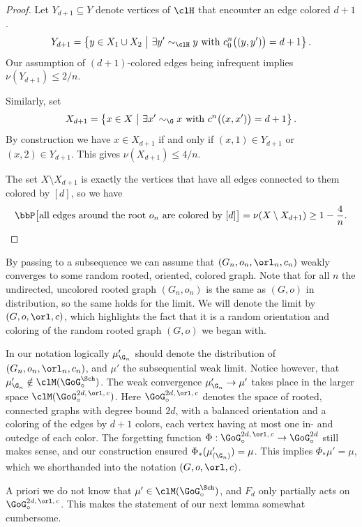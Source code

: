 \begin{proof}
Let $Y_{d+1}\subseteq Y$ denote vertices of $\clH$ that encounter an edge colored $d+1$.
\[
Y_{d+1}=\left\{y \in X_1 \cup X_2~\middle|~\exists y'\sim_{\clH} y \text{ with } c^n_0\big((y,y')\big)=d+1\right\}.
\]
Our assumption of $(d+1)$-colored edges being infrequent implies $\nu(Y_{d+1}) \leq 2/n$.

Similarly, set
\[
X_{d+1}=\left\{x \in X~\middle|~\exists x'\sim_{\G} x \text{ with } c^n\big((x,x')\big)=d+1\right\}.
\]
By construction we have $x \in X_{d+1}$ if and only if $(x,1) \in Y_{d+1}$ or $(x,2) \in Y_{d+1}$. This gives $\nu(X_{d+1}) \leq 4/n$.

The set $X \setminus X_{d+1}$ is exactly the vertices that have all edges connected to them colored by $[d]$, so we have
\[
\bbP \big[\text{all edges around the root } o_n \text{ are colored by } [d]\big] = \nu(X \setminus X_{d+1}) \geq 1 - \frac{4}{n}.\qedhere
\]
\end{proof}

By passing to a subsequence we can assume that $(G_n,o_n,\orl_n,c_n)$ weakly converges to some random rooted, oriented, colored graph. Note that for all $n$ the undirected, uncolored rooted graph $(G_n,o_n)$ is the same as $(G,o)$ in distribution, so the same holds for the limit. We will denote the limit by $(G,o,\orl, c)$, which highlights the fact that it is a random orientation and coloring of the random rooted graph $(G,o)$ we began with.

\begin{rema*}
In our notation logically $\mu'_{\G_n}$ should denote the distribution of $(G_n,o_n,\linebreak\orl_n,c_n)$, and $\mu'$ the subsequential weak limit. Notice however, that $\mu'_{\G_n} \notin \clM(\GoG^{\Sch}_{\circ})$. The weak convergence $\mu'_{\G_n} \to \mu'$ takes place in the larger space $\clM(\GoG^{2d,\,\orl,\,c}_{\circ})$. Here $\GoG^{2d,\,\orl,\,c}_{\circ}$ denotes the space of rooted, connected graphs with degree bound $2d$, with a balanced orientation and a coloring of the edges by $d+1$ colors, each vertex having at most one in- and outedge of each color. The forgetting function $\Phi: \GoG^{2d,\,\orl,\,c}_{\circ} \to \GoG^{2d}_{\circ}$ still makes sense, and our construction ensured $\Phi_{*}(\mu'_{(\G_n)}) = \mu$. This implies $\Phi_{*} \mu'=\mu$, which we shorthanded into the notation $(G,o,\orl, c)$.

A priori we do not know that $\mu' \in \clM(\GoG^{\Sch}_{\circ})$, and $F_d$ only partially acts on $\GoG^{2d,\,\orl,\,c}_{\circ}$. This makes the statement of our next lemma somewhat cumbersome.
\end{rema*}


